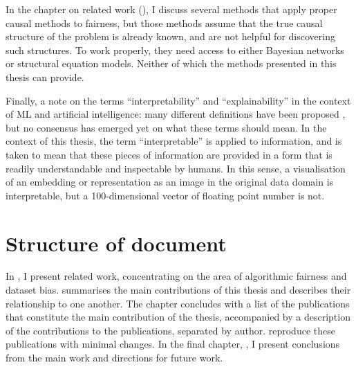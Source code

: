 In the chapter on related work (),
I discuss several methods that apply proper causal methods to fairness,
but those methods assume that the true causal structure of the problem is already known,
and are not helpful for discovering such structures.
To work properly, they need access to either Bayesian networks or structural equation models.
Neither of which the methods presented in this thesis can provide.

Finally, a note on the terms ``interpretability'' and ``explainability'' in the context of \ac{ML} and artificial intelligence:
many different definitions have been proposed \citep{barredoarrieta2020xai},
but no consensus has emerged yet on what these terms should mean.
In the context of this thesis, the term ``interpretable'' is applied to information,
and is taken to mean that these pieces of information are provided in a form that is readily understandable and inspectable by humans.
In this sense, a visualisation of an embedding or representation as an image in the original data domain
is interpretable,
but a 100-dimensional vector of floating point number is not.

\section{Structure of document}%
\label{sec:thesis-structure}
In , I present related work,
concentrating on the area of algorithmic fairness and dataset bias.
 summarises the main contributions of this thesis
and describes their relationship to one another.
The chapter concludes with a list of the publications that constitute the main contribution of the thesis,
accompanied by a description of the contributions to the publications, separated by author.
 reproduce these publications with minimal changes.
In the final chapter, , I present conclusions from the main work and directions for future work.
